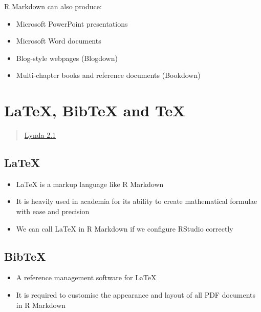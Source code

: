 \documentclass[]{article}
\providecommand{\tightlist}{%
  \setlength{\itemsep}{0pt}\setlength{\parskip}{0pt}}
\begin{document}
R Markdown can also produce:

\begin{itemize}
\tightlist
\item
  Microsoft PowerPoint presentations
\item
  Microsoft Word documents
\item
  Blog-style webpages (Blogdown)
\item
  Multi-chapter books and reference documents (Bookdown)
\end{itemize}

\hypertarget{latex-bibtex-and-tex}{%
\section{LaTeX, BibTeX and TeX}\label{latex-bibtex-and-tex}}

\begin{quote}
\href{https://www.lynda.com/RStudio-tutorials/What-LaTeX-BibTeX/699348/2700132-4.html?srchtrk=index\%3a1\%0alinktypeid\%3a2\%0aq\%3ar+markdown\%0apage\%3a1\%0as\%3arelevance\%0asa\%3atrue\%0aproducttypeid\%3a2}{Lynda
2.1}
\end{quote}

\hypertarget{latex}{%
\subsection{LaTeX}\label{latex}}

\begin{itemize}
\tightlist
\item
  LaTeX is a markup language like R Markdown
\item
  It is heavily used in academia for its ability to create mathematical
  formulae with ease and precision
\item
  We can call LaTeX in R Markdown if we configure RStudio correctly
\end{itemize}

\hypertarget{bibtex}{%
\subsection{BibTeX}\label{bibtex}}

\begin{itemize}
\tightlist
\item
  A reference management software for LaTeX
\item
  It is required to customise the appearance and layout of all PDF
  documents in R Markdown
\end{itemize}
\end{document}
